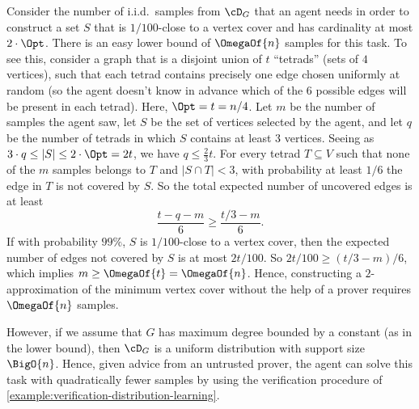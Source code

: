 \documentclass{toc}
\begin{document}
\begin{example}
	Consider the number of i.i.d.\ samples from $\cD_G$ that an agent needs in order to construct a set $S$ that is $1/100$-close to a vertex cover and has cardinality at most $2\cdot\Opt$. There is an easy lower bound of $\OmegaOf{n}$ samples for this task. To see this, consider a graph that is a disjoint union of $t$ ``tetrads'' (sets of $4$ vertices), such that each tetrad contains precisely one edge chosen uniformly at random (so the agent doesn't know in advance which of the $6$ possible edges will be present in each tetrad). Here, $\Opt = t = n/4$. Let $m$ be the number of samples the agent saw, let $S$ be the set of vertices selected by the agent, and let $q$ be the number of tetrads in which $S$ contains at least $3$ vertices. Seeing as $3\cdot q \leq |S| \leq 2\cdot\Opt = 2t$, we have $q \leq \frac{2}{3}t$. For every tetrad $T \subseteq V$ such that none of the $m$ samples belongs to $T$ and $|S\cap T| < 3$, with probability at least $1/6$ the edge in $T$ is not covered by $S$. So the total expected number of uncovered edges is at least
	\[
		\frac{t - q - m}{6} \geq \frac{t/3 - m}{6}.
	\]
	If with probability $99\%$, $S$ is $1/100$-close to a vertex cover, then the expected number of edges not covered by $S$ is at most $2t/100$. So $2t/100 \geq (t/3 - m)/6$, which implies $m \geq \OmegaOf{t} = \OmegaOf{n}$. Hence, constructing a $2$-approximation of the minimum vertex cover without the help of a prover requires $\OmegaOf{n}$ samples.

	However, if we assume that $G$ has maximum degree bounded by a constant (as in the lower bound), then $\cD_G$ is a uniform distribution with support size $\BigO{n}$. Hence, given advice from an untrusted prover, the agent can solve this task with quadratically fewer samples by using the verification procedure of \cref{example:verification-distribution-learning}.


\end{example}
\end{document}
